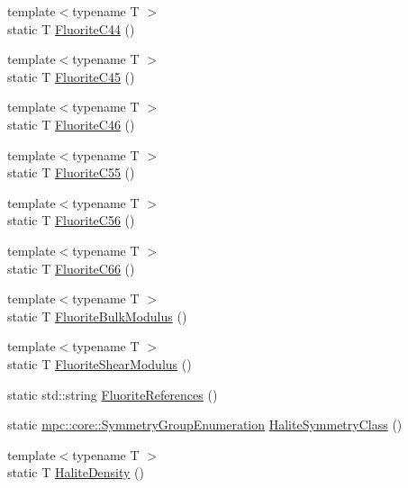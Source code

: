 \begin{DoxyCompactItemize}
\item 
{\footnotesize template$<$typename T $>$ }\\static T \mbox{\hyperlink{namespacempc_1_1data_a44562307085553166b270cddf142878b}{Fluorite\+C44}} ()
\item 
{\footnotesize template$<$typename T $>$ }\\static T \mbox{\hyperlink{namespacempc_1_1data_a04bbdc764d42ae11e31072dc709035f2}{Fluorite\+C45}} ()
\item 
{\footnotesize template$<$typename T $>$ }\\static T \mbox{\hyperlink{namespacempc_1_1data_ab74d5e645196831e463c9ca58081c9da}{Fluorite\+C46}} ()
\item 
{\footnotesize template$<$typename T $>$ }\\static T \mbox{\hyperlink{namespacempc_1_1data_a6ce2dad81f20bcd46967fa289d516d29}{Fluorite\+C55}} ()
\item 
{\footnotesize template$<$typename T $>$ }\\static T \mbox{\hyperlink{namespacempc_1_1data_a37ccc062d97d121462cd8821adfc48ce}{Fluorite\+C56}} ()
\item 
{\footnotesize template$<$typename T $>$ }\\static T \mbox{\hyperlink{namespacempc_1_1data_afed8baf0b0afd43e83c288db108754c9}{Fluorite\+C66}} ()
\item 
{\footnotesize template$<$typename T $>$ }\\static T \mbox{\hyperlink{namespacempc_1_1data_a300bdda2f3bc514ca3eceb4784c7c5a8}{Fluorite\+Bulk\+Modulus}} ()
\item 
{\footnotesize template$<$typename T $>$ }\\static T \mbox{\hyperlink{namespacempc_1_1data_af26256e493b9d16e48589f42bbe88adb}{Fluorite\+Shear\+Modulus}} ()
\item 
static std\+::string \mbox{\hyperlink{namespacempc_1_1data_abdd0aceded0abf960de4a0dad20bfa2f}{Fluorite\+References}} ()
\item 
static \mbox{\hyperlink{namespacempc_1_1core_a9d979684062547055a0ef5c13077bad8}{mpc\+::core\+::\+Symmetry\+Group\+Enumeration}} \mbox{\hyperlink{namespacempc_1_1data_a932cfb05d431249b44ab372a849edcde}{Halite\+Symmetry\+Class}} ()
\item 
{\footnotesize template$<$typename T $>$ }\\static T \mbox{\hyperlink{namespacempc_1_1data_a05ac4ad7e377d10cf924f30c12281826}{Halite\+Density}} ()
\item 

\end{DoxyCompactItemize}

